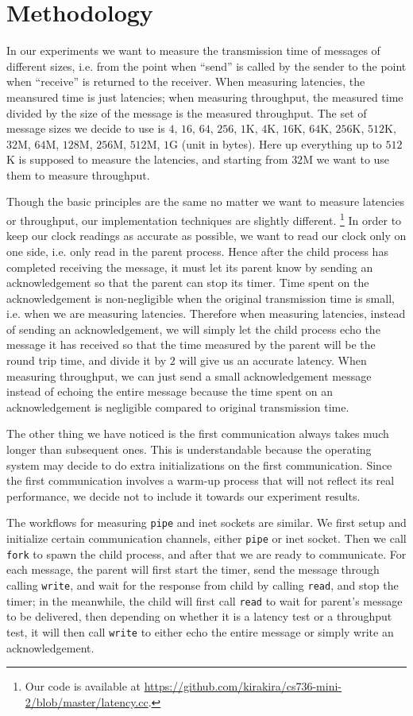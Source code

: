 \documentclass[11pt,conference]{IEEEtran}
\begin{document}
\section{Methodology}
\label{sec:method}
In our experiments we want to measure the transmission time of messages of different sizes, i.e. from the point when ``send'' is called by the sender to the point when ``receive'' is returned to the receiver.
When measuring latencies, the meansured time is just latencies; when measuring throughput, the measured time divided by the size of the message is the measured throughput.
The set of message sizes we decide to use is $4$, $16$, $64$, $256$, $1$K, $4$K, $16$K, $64$K, $256$K, $512$K, $32$M, $64$M, $128$M, $256$M, $512$M, $1$G (unit in bytes).
Here up everything up to $512$K is supposed to measure the latencies, and starting from $32$M we want to use them to measure throughput.

Though the basic principles are the same no matter we want to measure latencies or throughput, our implementation techniques are slightly different.
\footnote{Our code is available at \url{https://github.com/kirakira/cs736-mini-2/blob/master/latency.cc}.}
In order to keep our clock readings as accurate as possible, we want to read our clock only on one side, i.e. only read in the parent process.
Hence after the child process has completed receiving the message, it must let its parent know by sending an acknowledgement so that the parent can stop its timer.
Time spent on the acknowledgement is non-negligible when the original transmission time is small, i.e. when we are measuring latencies.
Therefore when measuring latencies, instead of sending an acknowledgement, we will simply let the child process echo the message it has received so that the time measured by the parent will be the round trip time, and divide it by $2$ will give us an accurate latency.
When measuring throughput, we can just send a small acknowledgement message instead of echoing the entire message because the time spent on an acknowledgement is negligible compared to original transmission time.

The other thing we have noticed is the first communication always takes much longer than subsequent ones.
This is understandable because the operating system may decide to do extra initializations on the first communication.
Since the first communication involves a warm-up process that will not reflect its real performance, we decide not to include it towards our experiment results.

The workflows for measuring \texttt{pipe} and inet sockets are similar.
We first setup and initialize certain communication channels, either \texttt{pipe} or inet socket.
Then we call \texttt{fork} to spawn the child process, and after that we are ready to communicate.
For each message, the parent will first start the timer, send the message through calling \texttt{write}, and wait for the response from child by calling \texttt{read}, and stop the timer; in the meanwhile, the child will first call \texttt{read} to wait for parent's message to be delivered, then depending on whether it is a latency test or a throughput test, it will then call \texttt{write} to either echo the entire message or simply write an acknowledgement.
\end{document}
